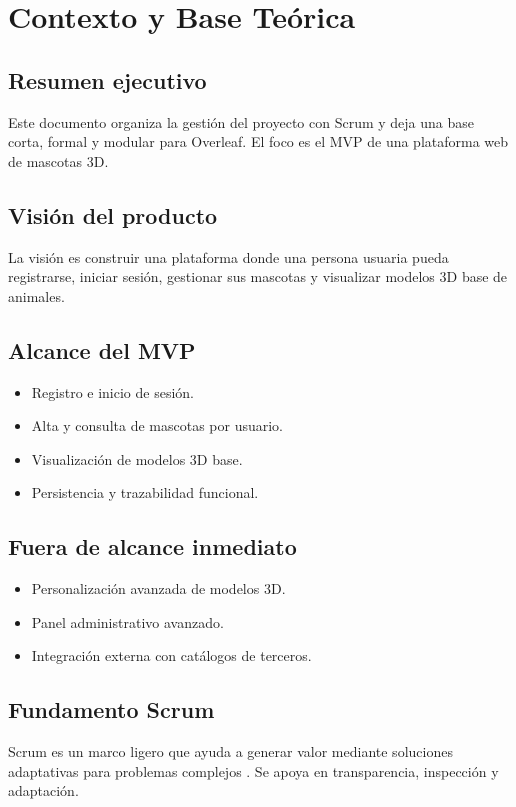 \section{Contexto y Base Te\'orica}
\subsection{Resumen ejecutivo}
Este documento organiza la gesti\'on del proyecto con Scrum y deja una base corta, formal y modular para Overleaf. El foco es el MVP de una plataforma web de mascotas 3D.

\subsection{Visi\'on del producto}
La visi\'on es construir una plataforma donde una persona usuaria pueda registrarse, iniciar sesi\'on, gestionar sus mascotas y visualizar modelos 3D base de animales.

\subsection{Alcance del MVP}
\begin{itemize}[leftmargin=*]
    \item Registro e inicio de sesi\'on.
    \item Alta y consulta de mascotas por usuario.
    \item Visualizaci\'on de modelos 3D base.
    \item Persistencia y trazabilidad funcional.
\end{itemize}

\subsection{Fuera de alcance inmediato}
\begin{itemize}[leftmargin=*]
    \item Personalizaci\'on avanzada de modelos 3D.
    \item Panel administrativo avanzado.
    \item Integraci\'on externa con cat\'alogos de terceros.
\end{itemize}

\subsection{Fundamento Scrum}
Scrum es un marco ligero que ayuda a generar valor mediante soluciones adaptativas para problemas complejos \cite{schwaber2020}. Se apoya en transparencia, inspecci\'on y adaptaci\'on.


